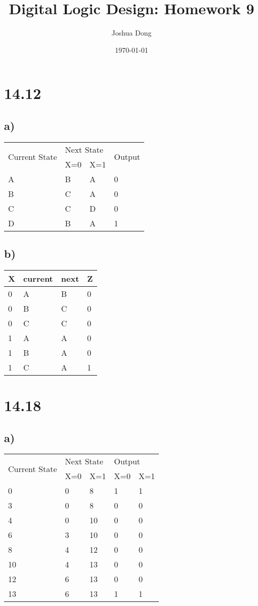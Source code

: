 \documentclass{article}
\begin{document}
\title{Digital Logic Design: Homework 9}
\author{Joshua Dong}
\date{\today}
\maketitle

\section{14.12}
\subsection{a)}
\begin{tabular}{l | l | l | l}
\multirow{2}{*}{Current State} & \multicolumn{2}{|l|}{Next State} & \multirow{2}{*}{Output} \\
                               & X=0            & X=1           &                         \\
\hline
A & B & A & 0 \\ %
B & C & A & 0 \\ %
C & C & D & 0 \\ %
D & B & A & 1 \\ %
\end{tabular}

\subsection{b)}
\begin{tabular}{l | l | l | l}
X & current & next & Z  \\
\hline
0 & A & B & 0 \\
0 & B & C & 0 \\
0 & C & C & 0 \\
1 & A & A & 0 \\
1 & B & A & 0 \\
1 & C & A & 1
\end{tabular}

\section{14.18}
\subsection{a)}
\begin{tabular}{l | l | l | l | l}
\multirow{2}{*}{Current State} & \multicolumn{2}{|l|}{Next State} & \multicolumn{2}{l}{Output} \\
                               & X=0            & X=1           & X=0          & X=1         \\
\hline
0  & 0  & 8  & 1 & 1 \\
3  & 0  & 8  & 0 & 0 \\
4  & 0  & 10 & 0 & 0 \\
6  & 3  & 10 & 0 & 0 \\
8  & 4  & 12 & 0 & 0 \\
10 & 4  & 13 & 0 & 0 \\
12 & 6  & 13 & 0 & 0 \\
13 & 6  & 13 & 1 & 1 \\
\end{tabular}
\end{document}
